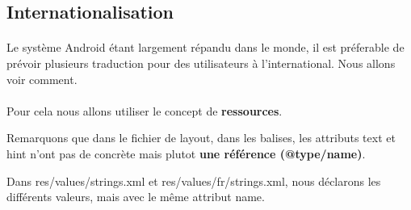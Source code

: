 \documentclass[a4paper]{article}
\begin{document}
\begin{multicols}{2}
  \subsection{Internationalisation}
  \paragraph{}
    Le système Android étant largement répandu dans le monde, il est préferable de prévoir plusieurs traduction pour des utilisateurs à l'international. Nous allons voir comment.
  \paragraph{}
    Pour cela nous allons utiliser le concept de \textbf{ressources}.  

    Remarquons que dans le fichier de layout, dans les balises, les attributs text et hint n'ont pas de concrète mais plutot \textbf{une référence (@type/name)}. \par
    Dans res/values/strings.xml et res/values/fr/strings.xml, nous déclarons les différents valeurs, mais avec le même attribut name. 
    

\end{multicols}
\end{document}

